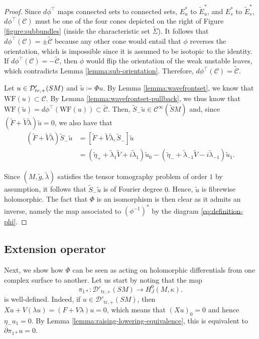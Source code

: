 \documentclass[reqno,12pt,letterpaper]{amsart}
\theoremstyle{definition}
\theoremstyle{remark}
\theoremstyle{definition}
\numberwithin{equation}{section}
\begin{document}
\begin{proof}
Since $d\phi^\top$ maps connected sets to connected sets, $E_u^*$ to $\widetilde{E}_u^*$, and $E_s^*$ to $\widetilde{E}_s^*$, $d\phi^\top(\mathcal{C})$ must be one of the four cones depicted on the right of Figure \ref{figure:subbundles} (inside the characteristic set $\widetilde{\Sigma}$). It follows that $d\phi^\top(\mathcal{C})=\pm \widetilde{\mathcal{C}}$ because any other cone would entail that $\phi$ reverses the orientation, which is impossible since it is assumed to be isotopic to the identity. If $d\phi^\top(\mathcal{C})=- \widetilde{\mathcal{C}}$, then $\phi$ would flip the orientation of the weak unstable leaves, which contradicts Lemma \ref{lemma:sub-orientation}. Therefore, $d\phi^\top(\mathcal{C})= \widetilde{\mathcal{C}}$.

Let $u\in \mathcal{D}'_{\textup{tr},+}(SM)$ and $\tilde{u}\coloneqq\Phi u$. By Lemma \ref{lemma:wavefrontset}, we know that $\text{WF}(u)\subset \mathcal{C}$. By Lemma \ref{lemma:wavefrontset-pullback}, we thus know that $\text{WF}(\tilde{u})=d\phi^\top (\text{WF}(u))\subset  \widetilde{\mathcal{C}}$.  Then, $\widetilde{S}_- \tilde{u}\in \mathcal{C}^\infty(\widetilde{S}M)$ and, since $(\widetilde{F}+\widetilde{V}\tilde{\lambda})\tilde{u}=0$, we also have that 
\begin{equation*}
\begin{alignedat}{1}
(\widetilde{F}+\widetilde{V}\tilde{\lambda})\widetilde{S}_-\tilde{u}&=[\widetilde{F} + \widetilde{V}\tilde{\lambda}, \widetilde{S}_-]\tilde{u}\\
&=(\tilde{\eta}_++\tilde{\lambda}_1\widetilde{V}+i\tilde{\lambda}_1)\tilde{u}_0-(\tilde{\eta}_-+\tilde{\lambda}_{-1}\widetilde{V}-i\tilde{\lambda}_{-1})\tilde{u}_1.
\end{alignedat}
\end{equation*}

Since $(M, \tilde{g}, \tilde{\lambda})$ satisfies the tensor tomography problem of order $1$ by assumption, it follows that $\widetilde{S}_-\tilde{u}$ is of Fourier degree $0$. Hence, $\tilde{u}$ is fibrewise holomorphic. The fact that $\Phi$ is an isomorphism is then clear as it admits an inverse, namely the map associated to $(\phi^{-1})^*$ by the diagram \eqref{eq:definition-phi}. 
\end{proof}
\subsection{Extension operator} Next, we show how $\Phi$ can be seen as acting on holomorphic differentials from one complex surface to another. Let us start by noting that the map 
\begin{equation}\label{eq:above-extension}
\pi_{1\ast}: \mathcal{D}'_{\text{tr},+}(SM)\to H_J^0(M, \kappa).
\end{equation}
is well-defined. Indeed, if $u \in \mathcal{D}'_{\text{tr},+}(SM)$, then $Xu+V(\lambda u)=(F+V\lambda)u=0$, which means that $(Xu)_0=0$ and hence $\eta_-u_1=0$. By Lemma \ref{lemma:raising-lowering-equivalence}, this is equivalent to $\overline{\partial}\pi_{1\ast} u = 0$. 
\end{document}
